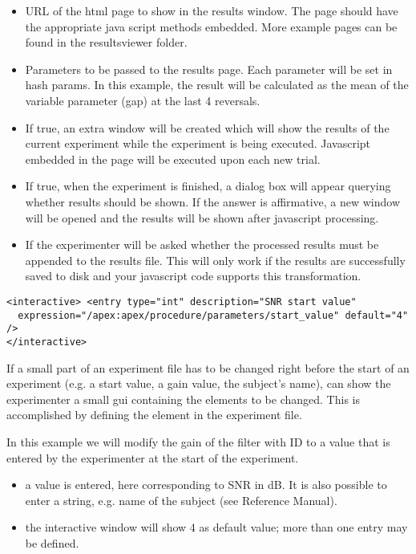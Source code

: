 \begin{itemize} 
\item {} URL of the html page to show in the results window. The page should have the appropriate java script methods embedded. More example pages can be found in the \apex resultsviewer folder.
\item {} Parameters to be passed to the results page. Each parameter will be set in hash params. In this example, the result will be calculated as the mean of the variable parameter (gap) at the last 4 reversals.  
\item {} If true, an extra window will be created which will show the results of the current experiment while the experiment is being executed. Javascript embedded in the page will be executed upon each new trial.
\item {} If true, when the experiment is finished, a dialog box will appear querying whether results should be shown. If the answer is affirmative, a new window will be opened and the results will be shown after javascript processing.
\item {} If  the
experimenter will be asked whether the processed results must be
appended to the results file. This will only work if the results are successfully saved to disk and your javascript code supports this transformation.
\end{itemize}

     


\begin{lstlisting}
<interactive> <entry type="int" description="SNR start value"
  expression="/apex:apex/procedure/parameters/start_value" default="4" />
</interactive>
\end{lstlisting}

If a small part of an experiment file has to be changed right
before the start of an experiment (e.g. a start value, a gain
value, the subject's name), \apex can show the experimenter a
small \ac{gui} containing the elements to be changed. This is
accomplished by defining the  element in the
experiment file.

In this example we will modify the gain of the filter with ID
 to a value that is entered by the experimenter at
the start of the experiment.

\begin{itemize}
\item {} a value is entered, here corresponding
to SNR in dB. It is also possible to enter a string, e.g. name of
the subject (see Reference Manual).

\item {} the interactive window will show 4 as
default value; more than one entry may be defined.
\end{itemize}



